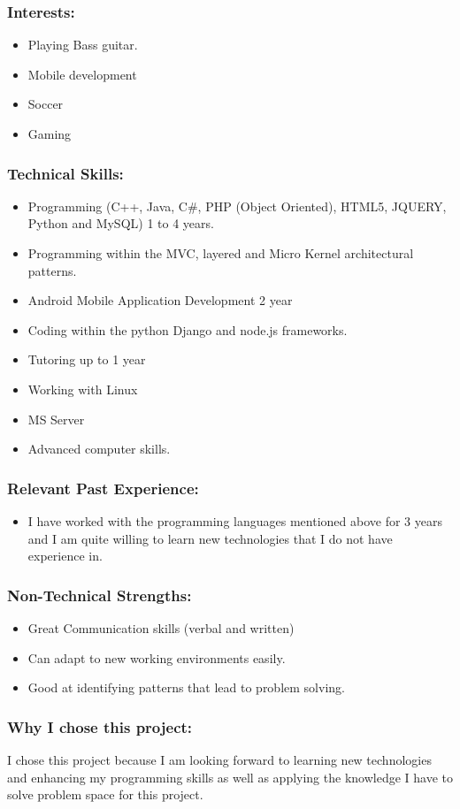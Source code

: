 \subsubsection{Interests:}
\begin{itemize}
		\item Playing Bass guitar.
		\item Mobile development
		\item Soccer
		\item Gaming
	\end{itemize}

\subsubsection{Technical Skills:}
\begin{itemize}
		\item Programming (C++, Java, C\#, PHP (Object Oriented), HTML5, JQUERY, Python and MySQL) 1 to 4 years.
		\item Programming within the MVC, layered and Micro Kernel architectural patterns.
		\item Android Mobile Application Development 2 year
		\item Coding within the python Django and node.js frameworks.
		\item Tutoring up to 1 year
		\item Working with Linux 
		\item MS Server
		\item Advanced computer skills.
	\end{itemize}

\subsubsection{Relevant Past Experience:}
\begin{itemize}
		\item I have worked with the programming languages mentioned above for 3 years and I am quite willing to learn new technologies that I do not have experience in.
\end{itemize}
\subsubsection{Non-Technical Strengths:}
\begin{itemize}
		\item Great Communication skills (verbal and written)
		\item Can adapt to new working environments easily.
		\item Good at identifying patterns that lead to problem solving.
\end{itemize}
\subsubsection{Why I chose this project:}
\par{I chose this project because I am looking forward to learning new technologies and enhancing my programming skills as well as applying the knowledge I have to solve problem space for this project.}
\newpage